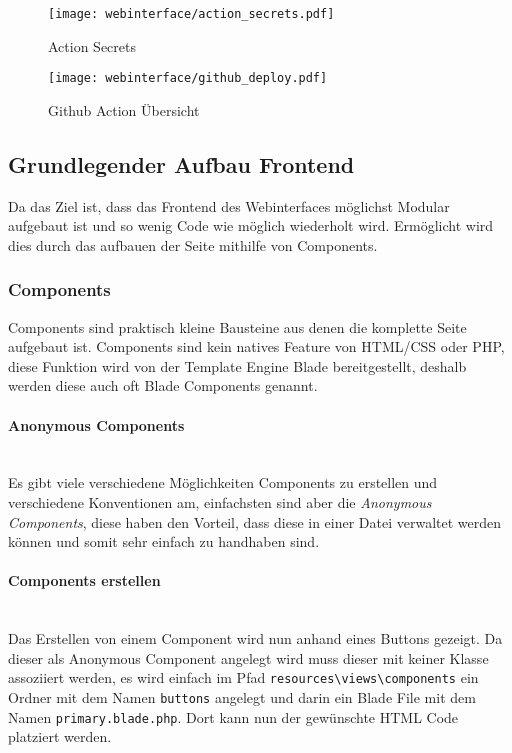\begin{figure}[H]
  \centering
  \texttt{[image: webinterface/action\_secrets.pdf]}
  \caption{Action Secrets}
\end{figure}

\begin{figure}[H]
  \centering
  \texttt{[image: webinterface/github\_deploy.pdf]}
  \caption{Github Action Übersicht}
\end{figure}


\subsection{Grundlegender Aufbau Frontend}

Da das Ziel ist, dass das Frontend des Webinterfaces möglichst Modular aufgebaut ist
und so wenig Code wie möglich wiederholt wird. Ermöglicht wird dies durch das
aufbauen der Seite mithilfe von Components.


\subsubsection{Components}

Components sind praktisch kleine Bausteine aus denen die komplette Seite
aufgebaut ist. Components sind kein natives Feature von HTML/CSS oder PHP, diese
Funktion wird von der Template Engine Blade bereitgestellt, deshalb werden diese
auch oft Blade Components genannt. 

\paragraph{Anonymous Components}\mbox{}\\

Es gibt viele verschiedene Möglichkeiten Components zu erstellen und
verschiedene Konventionen am, einfachsten sind aber die \textit{Anonymous Components}, 
diese haben den Vorteil, dass diese in einer Datei verwaltet werden
können und somit sehr einfach zu handhaben sind.

\paragraph{Components erstellen}\mbox{}\\

Das Erstellen von einem Component wird nun anhand eines Buttons gezeigt. Da
dieser als Anonymous Component angelegt wird muss dieser mit keiner Klasse
assoziiert werden, es wird einfach im Pfad \verb|resources\views\components| ein
Ordner mit dem Namen \verb|buttons| angelegt und darin ein Blade File mit dem
Namen \verb|primary.blade.php|. Dort kann nun der gewünschte HTML Code platziert
werden.


